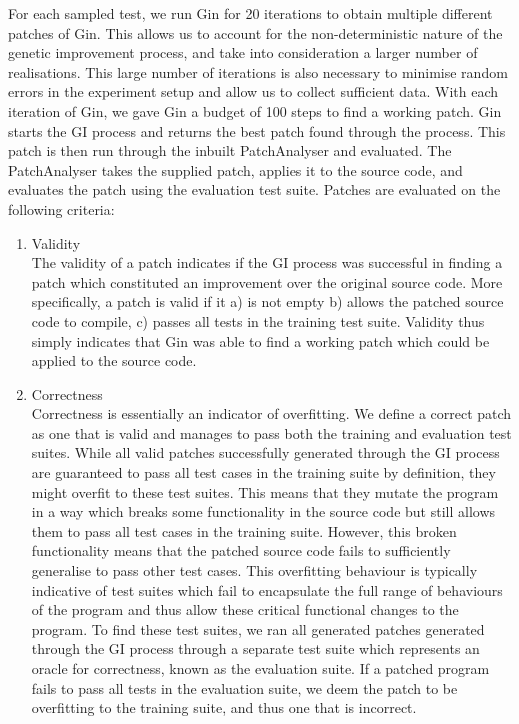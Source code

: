 \documentclass[titlepage]{article}
\begin{document}
For each sampled test, we run Gin for 20 iterations to obtain multiple different patches of Gin. This allows us to account for the non-deterministic nature of the genetic improvement process, and take into consideration a larger number of realisations. This large number of iterations is also necessary to minimise random errors in the experiment setup and allow us to collect sufficient data. With each iteration of Gin, we gave Gin a budget of 100 steps to find a working patch. Gin starts the GI process and returns the best patch found through the process.
This patch is then run through the inbuilt PatchAnalyser and evaluated. The PatchAnalyser takes the supplied patch, applies it to the source code, and evaluates the patch using the evaluation test suite. Patches are evaluated on the following criteria:
\begin{enumerate}
	\item Validity \\
 The validity of a patch indicates if the GI process was successful in finding a patch which constituted an improvement over the original source code. More specifically, a patch is valid if it a) is not empty b) allows the patched source code to compile, c) passes all tests in the training test suite. Validity thus simply indicates that Gin was able to find a working patch which could be applied to the source code. 

	\item Correctness \\
Correctness is essentially an indicator of overfitting. We define a correct patch as one that is valid and manages to pass both the training and evaluation test suites.  While all valid patches successfully generated through the GI process are guaranteed to pass all test cases in the training suite by definition, they might overfit to these test suites. This means that they mutate the program in a way which breaks some functionality in the source code but still allows them to pass all test cases in the training suite. However, this broken functionality means that the patched source code fails to sufficiently generalise to pass other test cases. This overfitting behaviour is typically indicative of test suites which fail to encapsulate the full range of behaviours of the program and thus allow these critical functional changes to the program. To find these test suites, we ran all generated patches generated through the GI process through a separate test suite which represents an oracle for correctness, known as the evaluation suite. If a patched program fails to pass all tests in the evaluation suite, we deem the patch to be overfitting to the training suite, and thus one that is incorrect. 


\end{enumerate}
\end{document}

